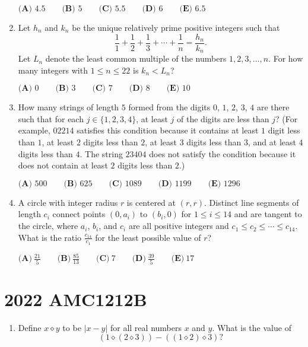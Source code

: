 \documentclass{article}
\begin{document}
\begin{enumerate}[label=\arabic*., itemsep=0.5em]
\(\textbf{(A) }4.5 \qquad\textbf{(B) }5 \qquad\textbf{(C) }5.5 \qquad\textbf{(D) }6\qquad\textbf{(E) }6.5\)\par \vspace{0.5em}\item Let \(h_n\) and \(k_n\) be the unique relatively prime positive integers such that 
\begin{equation*}
\frac{1}{1}+\frac{1}{2}+\frac{1}{3}+\cdots+\frac{1}{n}=\frac{h_n}{k_n}.
\end{equation*}
 Let \(L_n\) denote the least common multiple of the numbers \(1, 2, 3, \ldots, n\). For how many integers with \(1\le{n}\le{22}\) is \(k_n<L_n\)?

\(\textbf{(A) }0 \qquad\textbf{(B) }3 \qquad\textbf{(C) }7 \qquad\textbf{(D) }8\qquad\textbf{(E) }10\)\par \vspace{0.5em}\item How many strings of length \(5\) formed from the digits \(0\), \(1\), \(2\), \(3\), \(4\) are there such that for each \(j \in \{1,2,3,4\}\), at least \(j\) of the digits are less than \(j\)? (For example, \(02214\) satisfies this condition
because it contains at least \(1\) digit less than \(1\), at least \(2\) digits less than \(2\), at least \(3\) digits less
than \(3\), and at least \(4\) digits less than \(4\). The string \(23404\) does not satisfy the condition because it
does not contain at least \(2\) digits less than \(2\).)

\(\textbf{(A) }500\qquad\textbf{(B) }625\qquad\textbf{(C) }1089\qquad\textbf{(D) }1199\qquad\textbf{(E) }1296\)\par \vspace{0.5em}\item A circle with integer radius \(r\) is centered at \((r, r)\). Distinct line segments of length \(c_i\) connect points \((0, a_i)\) to \((b_i, 0)\) for \(1 \le i \le 14\) and are tangent to the circle, where \(a_i\), \(b_i\), and \(c_i\) are all positive integers and \(c_1 \le c_2 \le \cdots \le c_{14}\). What is the ratio \(\frac{c_{14}}{c_1}\) for the least possible value of \(r\)?

\(\textbf{(A)} ~\frac{21}{5} \qquad\textbf{(B)} ~\frac{85}{13} \qquad\textbf{(C)} ~7 \qquad\textbf{(D)} ~\frac{39}{5} \qquad\textbf{(E)} ~17 \)\par \vspace{0.5em}\end{enumerate}\newpage\section*{2022 AMC1212B}\begin{enumerate}[label=\arabic*., itemsep=0.5em]\item Define \(x\diamond y\) to be \(|x-y|\) for all real numbers \(x\) and \(y.\) What is the value of 
\begin{equation*}
(1\diamond(2\diamond3))-((1\diamond2)\diamond3)?
\end{equation*}



\end{enumerate}
\end{document}
